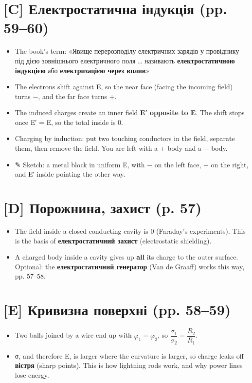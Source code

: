 \documentclass[11pt,a4paper,oneside]{book}
\newcommand{\pen}{{\sffamily\color{accent}✎}}
\begin{document}
\section*{[C] Електростатична індукція (pp. 59–60)}
\begin{itemize}
\item The book's term: «Явище перерозподілу електричних зарядів у провіднику під дією зовнішнього електричного поля … називають \textbf{електростатичною індукцією} або \textbf{електризацією через вплив}»
\item The electrons shift against E, so the near face (facing the incoming field) turns −, and the far face turns +.
\item The induced charges create an inner field \textbf{E′ opposite to E}. The shift stops once E′ = E, so the total inside is 0.
\item Charging by induction: put two touching conductors in the field, separate them, then remove the field. You are left with a + body and a − body.
\item \pen{} Sketch: a metal block in uniform E, with − on the left face, + on the right, and E′ inside pointing the other way.
\end{itemize}

\section*{[D] Порожнина, захист (p. 57)}
\begin{itemize}
\item The field inside a closed conducting cavity is 0 (Faraday's experiments). This is the basis of \textbf{електростатичний захист} (electrostatic shielding).
\item A charged body inside a cavity gives up \textbf{all} its charge to the outer surface. Optional: the \textbf{електростатичний генератор} (Van de Graaff) works this way, pp. 57–58.
\end{itemize}

\section*{[E] Кривизна поверхні (pp. 58–59)}
\begin{itemize}
\item Two balls joined by a wire end up with $\varphi_1=\varphi_2$, so $\dfrac{\sigma_1}{\sigma_2} = \dfrac{R_2}{R_1}$.
\item σ, and therefore E, is larger where the curvature is larger, so charge leaks off \textbf{вістря} (sharp points). This is how lightning rods work, and why power lines lose energy.
\end{itemize}
\end{document}
